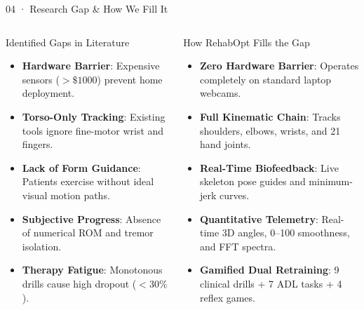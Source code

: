 \documentclass[aspectratio=169,11pt]{beamer}
\begin{document}
\begin{frame}{04 · Research Gap \& How We Fill It}
\begin{columns}[T]
\begin{block}{Identified Gaps in Literature}
\begin{itemize}
    \setlength{\itemsep}{1.5pt}
    \item \textbf{Hardware Barrier}: Expensive sensors ($>\$1000$) prevent home deployment.
    \item \textbf{Torso-Only Tracking}: Existing tools ignore fine-motor wrist and fingers.
    \item \textbf{Lack of Form Guidance}: Patients exercise without ideal visual motion paths.
    \item \textbf{Subjective Progress}: Absence of numerical ROM and tremor isolation.
    \item \textbf{Therapy Fatigue}: Monotonous drills cause high dropout ($<30\%$).
\end{itemize}
\end{block}

\begin{block}{How RehabOpt Fills the Gap}
\begin{itemize}
    \setlength{\itemsep}{1.5pt}
    \item \textbf{Zero Hardware Barrier}: Operates completely on standard laptop webcams.
    \item \textbf{Full Kinematic Chain}: Tracks shoulders, elbows, wrists, and 21 hand joints.
    \item \textbf{Real-Time Biofeedback}: Live skeleton pose guides and minimum-jerk curves.
    \item \textbf{Quantitative Telemetry}: Real-time 3D angles, 0--100 smoothness, and FFT spectra.
    \item \textbf{Gamified Dual Retraining}: 9 clinical drills + 7 ADL tasks + 4 reflex games.
\end{itemize}
\end{block}
\end{columns}
\end{frame}
\end{document}
